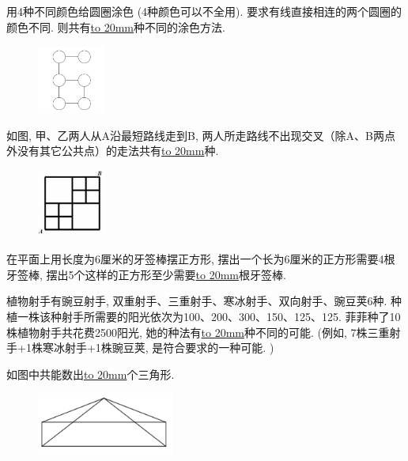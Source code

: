 \item {
    用4种不同颜色给圆圈涂色 (4种颜色可以不全用). 要求有线直接相连的两个圆圈的颜色不同. 则共有\underline{\hbox to 20mm{}}种不同的涂色方法.
    \begin{figure}[H] 
        \centering
        \includegraphics[width=0.2\textwidth]{./pics/Chapter_6/2016_3.png}
    \end{figure}
}

\item {
    如图, 甲、乙两人从A沿最短路线走到B, 两人所走路线不出现交叉（除A、B两点外没有其它公共点）的走法共有\underline{\hbox to 20mm{}}种. 
    \begin{figure}[H] 
        \centering
        \includegraphics[width=0.2\textwidth]{./pics/Chapter_6/2016_4.png}
    \end{figure}
}

\item {
    在平面上用长度为6厘米的牙签棒摆正方形, 摆出一个长为6厘米的正方形需要4根牙签棒, 摆出5个这样的正方形至少需要\underline{\hbox to 20mm{}}根牙签棒. 
    \vspace{1cm}
}

\item {
    植物射手有豌豆射手, 双重射手、三重射手、寒冰射手、双向射手、豌豆荚6种. 种植一株该种射手所需要的阳光依次为100、200、300、150、125、125. 菲菲种了10株植物射手共花费2500阳光, 她的种法有\underline{\hbox to 20mm{}}种不同的可能.  (例如, 7株三重射手+1株寒冰射手+1株豌豆荚, 是符合要求的一种可能. )
    \vspace{1cm}
}

\item {
    如图中共能数出\underline{\hbox to 20mm{}}个三角形.
    \begin{figure}[H] 
        \centering
        \includegraphics[width=0.4\textwidth]{./pics/Chapter_6/2015_1.png}
    \end{figure}
}

